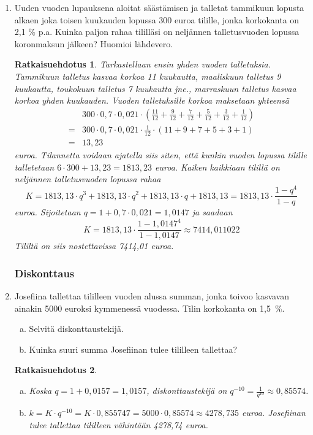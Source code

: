 \documentclass[a4paper,10pt,twoside]{article}
\newtheorem*{ratkaisu}{Ratkaisuehdotus}
\begin{document}
\begin{enumerate}
\item Uuden vuoden lupauksena aloitat säästämisen ja talletat tammikuun lopusta alkaen joka toisen kuukauden lopussa 300 euroa tilille,
jonka korkokanta on 2{,}1 \% p.a. Kuinka paljon rahaa tililläsi on neljännen talletusvuoden lopussa koronmaksun jälkeen? Huomioi lähdevero.
\begin{ratkaisu}
Tarkastellaan ensin yhden vuoden talletuksia. Tammikuun talletus kasvaa korkoa 11 kuukautta, maaliskuun talletus 9 kuukautta,
toukokuun talletus 7 kuukautta jne., marraskuun talletus kasvaa korkoa yhden kuukauden. Vuoden talletuksille korkoa maksetaan yhteensä
\begin{align*}
    &300\cdot0,7\cdot0,021\cdot\left(\frac{11}{12} + \frac{9}{12} + \frac{7}{12} + \frac{5}{12} + \frac{3}{12} + \frac{1}{12}\right)\\
    =&300\cdot0,7\cdot0,021\cdot\frac{1}{12}\cdot(11+9+7+5+3+1)\\
    =& 13,23
\end{align*}
euroa. Tilannetta voidaan ajatella siis siten, että kunkin vuoden \emph{lopussa} tilille talletetaan \(6\cdot300+13,23 = 1813,23\) euroa.
Kaiken kaikkiaan tilillä on neljännen talletusvuoden lopussa rahaa
\[
    K = 1813,13\cdot q^3 + 1813,13\cdot q^2 + 1813,13\cdot q + 1813,13 = 1813,13\cdot\frac{1-q^4}{1-q}
\]
euroa. Sijoitetaan \(q = 1 + 0,7\cdot0,021 = 1,0147\) ja saadaan
\[
    K = 1813,13\cdot\frac{1-1,0147^4}{1-1,0147} \approx 7414,011022
\]
Tililtä on siis nostettavissa 7414,01 euroa.
\end{ratkaisu}

\subsubsection*{Diskonttaus}

\item Josefiina tallettaa tililleen vuoden alussa summan, jonka toivoo kasvavan ainakin 5000 euroksi kymmenessä vuodessa. Tilin korkokanta on 1,5~\%.
\begin{enumerate}[(a)]
    \item Selvitä diskonttaustekijä.
    \item Kuinka suuri summa Josefiinan tulee tililleen tallettaa?
\end{enumerate}
\begin{ratkaisu}
    \begin{enumerate}[(a)]
        \item Koska \(q = 1 + 0,0157 = 1,0157\), diskonttaustekijä on \(q^{-10} = \frac{1}{q^{10}}\approx 0,85574\).
        \item \(k = K\cdot q^{-10} = K\cdot 0,855747 = 5000\cdot 0,85574 \approx 4278,735\) euroa.
        Josefiinan tulee tallettaa tililleen vähintään 4278,74 euroa.
    \end{enumerate}
\end{ratkaisu}


\end{enumerate}
\end{document}
